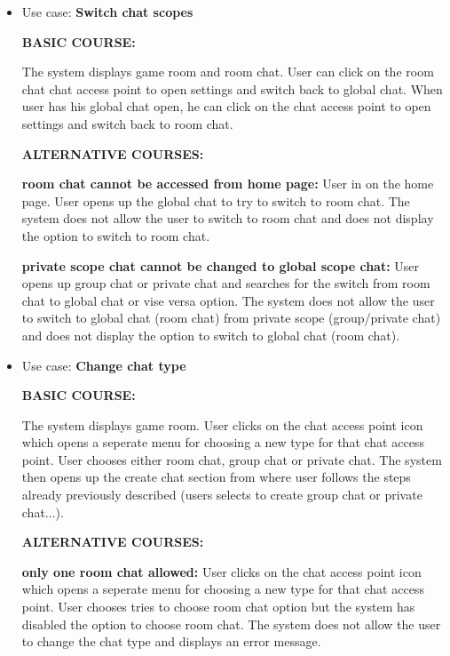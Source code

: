 \documentclass[]{VUMIFTemplateClass}
\begin{document}
\begin{itemize}
    \textbf{user has selected too many users:}
    User clicks on the create chat access point which opens chat creating section. User chooses private chat. User then chooses the create option and selects more that one user to add to the private chat. The system does not create the private chat access point and displays an error message.

    \item 
    Use case: \textbf{Switch chat scopes}

    \textbf{BASIC COURSE:}

    The system displays game room and room chat. User can click on the room chat chat access point to open settings and switch back to global chat. When user has his global chat open, he can click on the chat access point to open settings and switch back to room chat.

    \textbf{ALTERNATIVE COURSES:}

    \textbf{room chat cannot be accessed from home page:}
    User in on the home page. User opens up the global chat to try to switch to room chat. The system does not allow the user to switch to room chat and does not display the option to switch to room chat.

    \textbf{private scope chat cannot be changed to global scope chat:}
    User opens up group chat or private chat and searches for the switch from room chat to global chat or vise versa option. The system does not allow the user to switch to global chat (room chat) from private scope (group/private chat) and does not display the option to switch to global chat (room chat).
    
    \item 
    Use case: \textbf{Change chat type}

    \textbf{BASIC COURSE:}

    The system displays game room. User clicks on the chat access point icon which opens a seperate menu for choosing a new type for that chat access point. User chooses either room chat, group chat or private chat. The system then opens up the create chat section from where user follows the steps already previously described (users selects to create group chat or private chat...).

    \textbf{ALTERNATIVE COURSES:}

    \textbf{only one room chat allowed:}
    User clicks on the chat access point icon which opens a seperate menu for choosing a new type for that chat access point. User chooses tries to choose room chat option but the system has disabled the option to choose room chat. The system does not allow the user to change the chat type and displays an error message.


\end{itemize}
\end{document}
